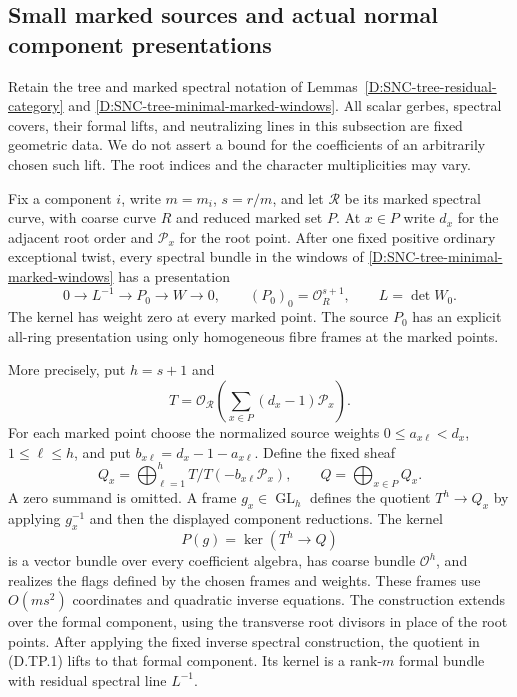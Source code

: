\subsection{Small marked sources and actual normal component presentations}

Retain the tree and marked spectral notation of
Lemmas~\ref{D:SNC-tree-residual-category} and
\ref{D:SNC-tree-minimal-marked-windows}. All scalar gerbes,
spectral covers, their formal lifts, and neutralizing lines in
this subsection are fixed geometric data. We do not assert a
bound for the coefficients of an arbitrarily chosen such lift.
The root indices and the character multiplicities may vary.

\begin{lemma}
\label{D:SNC-tree-small-marked-source}
Fix a component $i$, write $m=m_i$, $s=r/m$, and let
$\mathcal R$ be its marked spectral curve, with coarse curve
$R$ and reduced marked set $P$. At $x\in P$ write $d_x$
for the adjacent root order and $\mathcal P_x$ for the root
point. After one fixed positive ordinary exceptional twist,
every spectral bundle in the windows of
\ref{D:SNC-tree-minimal-marked-windows} has a presentation
\[
 0\longrightarrow L^{-1}\longrightarrow P_0
       \longrightarrow W\longrightarrow0,
 \qquad (P_0)_0=\mathcal O_R^{s+1},\qquad
 L=\det W_0.                                      \tag{D.TP.1}
\]
The kernel has weight zero at every marked point. The source
$P_0$ has an explicit all-ring presentation using only
homogeneous fibre frames at the marked points.

More precisely, put $h=s+1$ and
\[
 T=\mathcal O_{\mathcal R}
          \left(\sum_{x\in P}(d_x-1)\mathcal P_x\right).
                                                        \tag{D.TP.2}
\]
For each marked point choose the normalized source weights
$0\leq a_{x\ell}<d_x$, $1\leq\ell\leq h$, and put
$b_{x\ell}=d_x-1-a_{x\ell}$. Define the fixed sheaf
\[
 Q_x=\bigoplus_{\ell=1}^{h}
           T/T(-b_{x\ell}\mathcal P_x),
 \qquad Q=\bigoplus_{x\in P}Q_x.                    \tag{D.TP.3}
\]
A zero summand is omitted. A frame $g_x\in\operatorname{GL}_h$
defines the quotient $T^h\to Q_x$ by applying $g_x^{-1}$
and then the displayed component reductions. The kernel
\[
                 P(g)=\ker(T^h\longrightarrow Q)        \tag{D.TP.4}
\]
is a vector bundle over every coefficient algebra, has
coarse bundle $\mathcal O^h$, and realizes the flags defined
by the chosen frames and weights. These frames use
$O(ms^2)$ coordinates and quadratic inverse equations.
The construction extends over the formal component, using
the transverse root divisors in place of the root points.
After applying the fixed inverse spectral construction,
the quotient in (D.TP.1) lifts to that formal component.
Its kernel is a rank-$m$ formal bundle with residual
spectral line $L^{-1}$.
\end{lemma}

